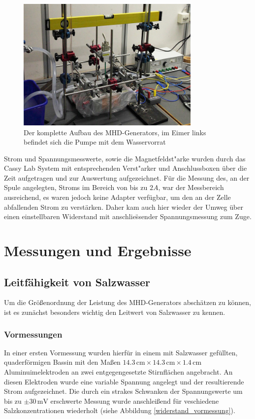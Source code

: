 \documentclass[11pt]{scrartcl}
\newcommand{\unit}[1]{\ensuremath{\,\mathrm{#1}}} %
\begin{document}
\begin{figure}[ht]
\begin{center}
\includegraphics[width=0.8\textwidth]{images/wwaage.jpg}
\end{center}
\vspace{-1.5\baselineskip}
\caption{Der komplette Aufbau des MHD-Generators, im Eimer links befindet sich die Pumpe mit dem Wasservorrat}
\label{wwaage}
\end{figure}

Strom und Spannungsmesswerte, sowie die Magnetfeldst"arke wurden durch das Cassy Lab System mit entsprechenden Verst"arker und Anschlussboxen \"uber die Zeit aufgetragen und zur Auswertung aufgezeichnet. F\"ur die Messung des, an der Spule angelegten, Stroms im Bereich von bis zu $2A$, war der Messbereich ausreichend, es waren jedoch keine Adapter verf\"ugbar, um den an der Zelle abfallenden Strom zu verst\"arken. Daher kam auch hier wieder der Umweg \"uber einen einstellbaren Widerstand mit anschlie\"ssender Spannungsmessung zum Zuge.





\section{Messungen und Ergebnisse}

\subsection{Leitfähigkeit von Salzwasser}\label{leit}		%
Um die Größenordnung der Leistung des MHD-Generators abschätzen zu können, ist es zunächst besonders wichtig den Leitwert von Salzwasser zu kennen.

\subsubsection{Vormessungen}
In einer ersten Vormessung wurden hierfür in einem mit Salzwasser gefüllten, quaderförmigen Bassin mit den Maßen $14.3 \unit{cm} \times 14.3 \unit{cm} \times 1.4 \unit{cm}$ Aluminuimelektroden an zwei entgegengesetzte Stirnflächen angebracht.
An diesen Elektroden wurde eine variable Spannung angelegt und der resultierende Strom aufgezeichnet. Die durch ein strakes Schwanken der Spannungswerte um bis zu $\pm 30 \unit{mV}$ erschwerte Messung wurde anschleißend für veschiedene Salzkonzentrationen wiederholt (siehe Abbildung \ref{widerstand_vormessung}).
\end{document}
